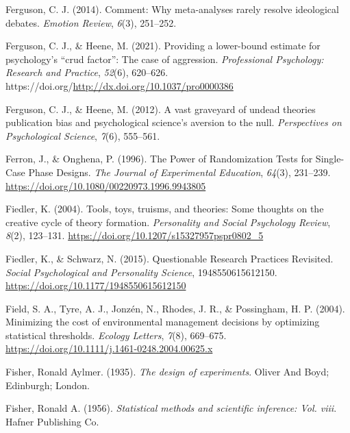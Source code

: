 \documentclass[
  oneside]{krantz}
\newlength{\cslhangindent}
\newlength{\cslentryspacingunit} %
\newenvironment{CSLReferences}[2] %
 {%
  \setlength{\parindent}{0pt}
  \ifodd #1
  \let\oldpar\par
  \def\par{\hangindent=\cslhangindent\oldpar}
  \fi
  \setlength{\parskip}{#2\cslentryspacingunit}
 }%
 {}
\begin{document}
\begin{CSLReferences}{1}{0}
\leavevmode{}%
Ferguson, C. J. (2014). Comment: {Why} meta-analyses rarely resolve
ideological debates. \emph{Emotion Review}, \emph{6}(3), 251--252.

\leavevmode{}%
Ferguson, C. J., \& Heene, M. (2021). Providing a lower-bound estimate
for psychology's {``crud factor''}: {The} case of aggression.
\emph{Professional Psychology: Research and Practice}, \emph{52}(6),
620--626. https://doi.org/\url{http://dx.doi.org/10.1037/pro0000386}

\leavevmode{}%
Ferguson, C. J., \& Heene, M. (2012). A vast graveyard of undead
theories publication bias and psychological science's aversion to the
null. \emph{Perspectives on Psychological Science}, \emph{7}(6),
555--561.

\leavevmode{}%
Ferron, J., \& Onghena, P. (1996). The {Power} of {Randomization Tests}
for {Single-Case Phase Designs}. \emph{The Journal of Experimental
Education}, \emph{64}(3), 231--239.
\url{https://doi.org/10.1080/00220973.1996.9943805}

\leavevmode{}%
Fiedler, K. (2004). Tools, toys, truisms, and theories: {Some} thoughts
on the creative cycle of theory formation. \emph{Personality and Social
Psychology Review}, \emph{8}(2), 123--131.
\url{https://doi.org/10.1207/s15327957pspr0802_5}

\leavevmode{}%
Fiedler, K., \& Schwarz, N. (2015). Questionable {Research Practices
Revisited}. \emph{Social Psychological and Personality Science},
1948550615612150. \url{https://doi.org/10.1177/1948550615612150}

\leavevmode{}%
Field, S. A., Tyre, A. J., Jonzén, N., Rhodes, J. R., \& Possingham, H.
P. (2004). Minimizing the cost of environmental management decisions by
optimizing statistical thresholds. \emph{Ecology Letters}, \emph{7}(8),
669--675. \url{https://doi.org/10.1111/j.1461-0248.2004.00625.x}

\leavevmode{}%
Fisher, Ronald Aylmer. (1935). \emph{The design of experiments}. {Oliver
And Boyd; Edinburgh; London}.

\leavevmode{}%
Fisher, Ronald A. (1956). \emph{Statistical methods and scientific
inference: Vol. viii}. {Hafner Publishing Co.}


\end{CSLReferences}
\end{document}
